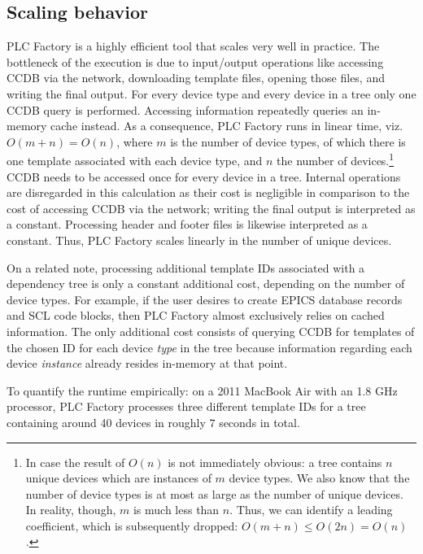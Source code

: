 \documentclass[a4paper,
              ]{jacow}
\begin{document}
\subsection{Scaling behavior}
\label{subsec:runtime}
PLC Factory is a highly efficient tool that scales very well in practice. The bottleneck of the execution is due to input/output operations like accessing CCDB via the network, downloading template files, opening those files, and writing the final output. For every device type and every device in a tree only one CCDB query is performed. Accessing information repeatedly queries an in-memory cache instead. As a consequence, PLC Factory runs in linear time, viz.\ $O(m + n) = O(n)$, where $m$ is the number of device types, of which there is one template associated with each device type, and $n$ the number of devices.\footnote{In case the result of $O(n)$ is not immediately obvious: a tree contains $n$ unique devices which are instances of $m$ device types. We also know that the number of device types is at most as large as the number of unique devices. In reality, though, $m$ is much less than $n$. Thus, we can identify a leading coefficient, which is subsequently dropped: $O(m + n) \le O(2n) = O(n)$.} CCDB needs to be accessed once for every device in a tree. Internal operations are disregarded in this calculation as their cost is negligible in comparison to the cost of accessing CCDB via the network; writing the final output is interpreted as a constant. Processing header and footer files is likewise interpreted as a constant. Thus, PLC Factory scales linearly in the number of unique devices.

On a related note, processing additional template IDs associated with a dependency tree is only a constant additional cost, depending on the number of device types. For example, if the user desires to create EPICS database records and SCL code blocks, then PLC Factory almost exclusively relies on cached information. The only additional cost consists of querying CCDB for templates of the chosen ID for each device \emph{type} in the tree because information regarding each device \emph{instance} already resides in-memory at that point.

To quantify the runtime empirically: on a 2011 MacBook Air with an 1.8 GHz processor, PLC Factory processes three different template IDs for a tree containing around 40 devices in roughly $7$ seconds in total.
\end{document}
